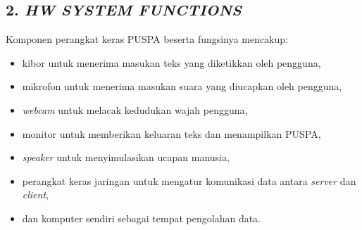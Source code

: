 \subsection*{\textcolor{subsectioncolor}{\textsf{2. \textit{HW SYSTEM FUNCTIONS}}}}


Komponen perangkat keras PUSPA beserta fungsinya mencakup:
\begin{itemize}
\item kibor untuk menerima masukan teks yang diketikkan oleh pengguna,
\item mikrofon untuk menerima masukan suara yang diucapkan oleh pengguna,
\item \textit{webcam} untuk melacak kedudukan wajah pengguna,
\item monitor untuk memberikan keluaran teks dan menampilkan PUSPA,
\item \textit{speaker} untuk menyimulasikan ucapan manusia,
\item perangkat keras jaringan untuk mengatur komunikasi data antara \textit{server} dan \textit{client},
\item dan komputer sendiri sebagai tempat pengolahan data.
\end{itemize}
